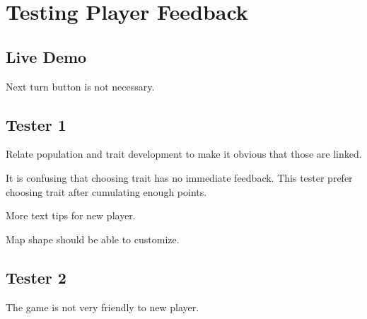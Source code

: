 \section{Testing Player Feedback}

\subsection{Live Demo}
Next turn button is not necessary.

\subsection{Tester 1}
Relate population and trait development to make it obvious that those are linked.

It is confusing that choosing trait has no immediate feedback. This tester prefer choosing trait after cumulating enough points.

More text tips for new player.

Map shape should be able to customize.

\subsection{Tester 2}
The game is not very friendly to new player.